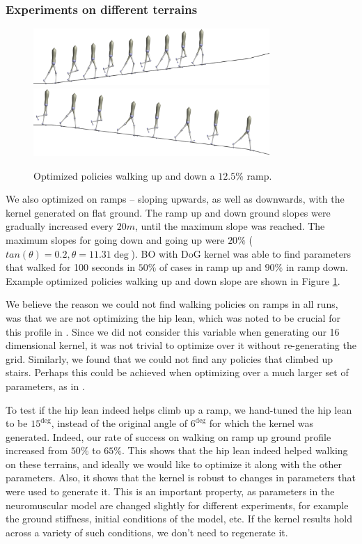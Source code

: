 \subsubsection{Experiments on different terrains}

\begin{figure}[t]
\centering
\includegraphics[width=0.8\textwidth]{img/rampup.png}
\vspace{10px}
\includegraphics[width=0.8\textwidth]{img/rampdown.png}
\caption{Optimized policies walking up and down a $12.5 \%$ ramp.}
\label{fig_ramp}
\end{figure}

We also optimized on ramps -- sloping upwards, as well as downwards, with the kernel generated on flat ground. The ramp up and down ground slopes were gradually increased every $20m$, until the maximum slope was reached. The maximum slopes for going down and going up were $20\%$ ($tan(\theta) = 0.2, \theta=11.31\deg$). BO with DoG kernel was able to find parameters that walked for 100 seconds in $50\%$ of cases in ramp up and $90\%$ in ramp down. Example optimized policies walking up and down slope are shown in Figure \ref{fig_ramp}.

We believe the reason we could not find walking policies on ramps in all runs, was that we are not optimizing the hip lean, which was noted to be crucial for this profile in \cite{song2015neural}. Since we did not consider this variable when generating our 16 dimensional kernel, it was not trivial to optimize over it without re-generating the grid. Similarly, we found that we could not find any policies that climbed up stairs. Perhaps this could be achieved when optimizing over a much larger set of parameters, as in \cite{song2015neural}. 

To test if the hip lean indeed helps climb up a ramp, we hand-tuned the hip lean to be $15^{\deg}$, instead of the original angle of $6^{\deg}$ for which the kernel was generated. Indeed, our rate of success on walking on ramp up ground profile increased from $50\%$ to $65\%$. %
This shows that the hip lean indeed helped walking on these terrains, and ideally we would like to optimize it along with the other parameters. Also, it shows that the \dogkernel kernel is robust to changes in parameters that were used to generate it. This is an important property, as parameters in the neuromuscular model are changed slightly for different experiments, for example the ground stiffness, initial conditions of the model, etc. If the kernel results hold across a variety of such conditions, we don't need to regenerate it.

